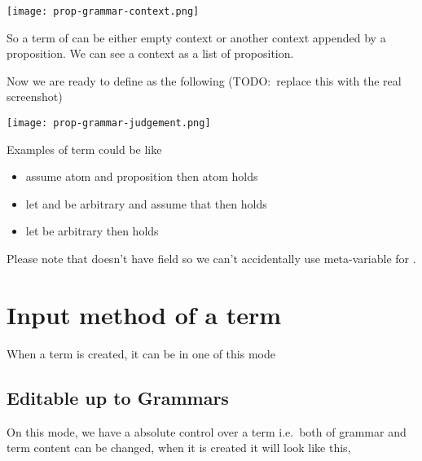 \documentclass[master.tex]{subfiles}
\begin{document}
\centerline{\texttt{[image: prop-grammar-context.png]}}

\newcommand{\propEmptyContext}{\bat{\pifmt{$\epsilon$}}}

So a term of  can be either empty context or another context
appended by a proposition. We can see a context as a list of proposition.

Now we are ready to define  as the following (TODO:\ replace
this with the real screenshot)

\centerline{\texttt{[image: prop-grammar-judgement.png]}}

\newcommand{\propTurnstile}{\pifmt{$\vdash$}}

Examples of  term could be like
\begin{itemize}
  \item \bat{\bat{\bat{\propEmptyContext\pifmt{,}\bat{\pvar{p}}}\pifmt{,}\bat{\bat{\pvar{p}}\propImp\bat{\pvar{q}}}}\propTurnstile\bat{\pvar{q}}}

  assume atom  and proposition  then atom  holds

  \item \bat{\bat{\propEmptyContext\pifmt{,}\bat{\pvar{B}\propAnd\pvar{A}}}\propTurnstile\bat{\pvar{A}\propAnd\pvar{B}}}

  let  and  be arbitrary  and assume that
       then 
      holds

  \item \bat{\propEmptyContext\propTurnstile\bat{\pvar{A}\propOr\bat{\propNot\pvar{A}}}}

  let  be arbitrary  then
   holds

\end{itemize}

Please note that  doesn't have field \kVarRegex so we can't
accidentally use meta-variable for .

\section{Input method of a term}

When a term is created, it can be in one of this mode

\subsection{Editable up to Grammars}
On this mode, we have a absolute control over a term i.e.\ both of grammar and
term content can be changed, when it is created it will look like this,
\end{document}
